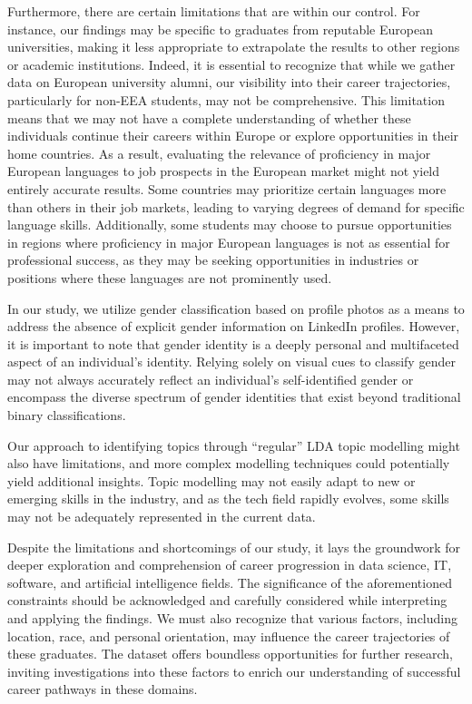 \documentclass[11pt,]{article}
\begin{document}
Furthermore, there are certain limitations that are within our control.
For instance, our findings may be specific to graduates from reputable
European universities, making it less appropriate to extrapolate the
results to other regions or academic institutions. Indeed, it is
essential to recognize that while we gather data on European university
alumni, our visibility into their career trajectories, particularly for
non-EEA students, may not be comprehensive. This limitation means that
we may not have a complete understanding of whether these individuals
continue their careers within Europe or explore opportunities in their
home countries. As a result, evaluating the relevance of proficiency in
major European languages to job prospects in the European market might
not yield entirely accurate results. Some countries may prioritize
certain languages more than others in their job markets, leading to
varying degrees of demand for specific language skills. Additionally,
some students may choose to pursue opportunities in regions where
proficiency in major European languages is not as essential for
professional success, as they may be seeking opportunities in industries
or positions where these languages are not prominently used.

In our study, we utilize gender classification based on profile photos
as a means to address the absence of explicit gender information on
LinkedIn profiles. However, it is important to note that gender identity
is a deeply personal and multifaceted aspect of an individual's
identity. Relying solely on visual cues to classify gender may not
always accurately reflect an individual's self-identified gender or
encompass the diverse spectrum of gender identities that exist beyond
traditional binary classifications.

Our approach to identifying topics through ``regular'' LDA topic
modelling might also have limitations, and more complex modelling
techniques could potentially yield additional insights. Topic modelling
may not easily adapt to new or emerging skills in the industry, and as
the tech field rapidly evolves, some skills may not be adequately
represented in the current data.

Despite the limitations and shortcomings of our study, it lays the
groundwork for deeper exploration and comprehension of career
progression in data science, IT, software, and artificial intelligence
fields. The significance of the aforementioned constraints should be
acknowledged and carefully considered while interpreting and applying
the findings. We must also recognize that various factors, including
location, race, and personal orientation, may influence the career
trajectories of these graduates. The dataset offers boundless
opportunities for further research, inviting investigations into these
factors to enrich our understanding of successful career pathways in
these domains.
\end{document}
